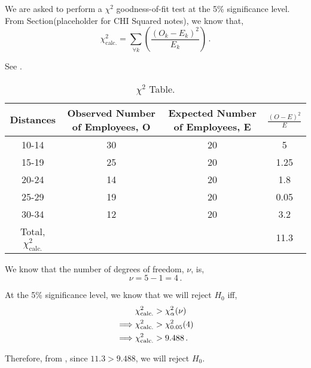 \begin{subquestions}
\begin{subsubquestions}
\subsubquestion
We are asked to perform a $\chi^2$ goodness-of-fit test at the 5\% significance level. From Section(placeholder for CHI Squared notes), we know that,
\begin{equation}
	\chi^2_{\text{calc.}} = \sum_{\forall k} \left( \frac{(O_k-E_k)^2}{E_k}\right) \,.
\end{equation}

 See .
\begin{table}[H]
	\centering
	\begin{tabular}{|c|c|c|c|}
		\hline
		Distances & Observed Number of Employees, O & Expected Number of Employees, E & $\frac{(O-E)^2}{E}$\\
		\hline 
		10-14 & 30 & 20 & 5 \\
		15-19 & 25 & 20 & 1.25 \\
		20-24 & 14 & 20 & 1.8 \\
		25-29 & 19 & 20 & 0.05 \\
		30-34 & 12 & 20 & 3.2 \\
		\hline
		Total, $\chi^2_{\text{calc.}}$ & & & 11.3 \\
		\hline
	\end{tabular}
	\caption{\label{2010:q4:ChiTab} $\chi^2$ Table.}
\end{table}	

 We know that the number of degrees of freedom, $\nu$, is,
\begin{equation}
	\nu = 5-1 = 4\,.
\end{equation}

At the 5\% significance level, we know that we will reject $H_0$ iff,
\begin{align}
	&\chi^2_{\text{calc.}} > \chi^2_{\alpha}(\nu) \nonumber \\
	\implies & \chi^2_{\text{calc.}} > \chi^2_{0.05}(4) \nonumber \\
	\implies & \chi^2_{\text{calc.}} > 9.488 \,.
\end{align} 

Therefore, from , since $11.3>9.488$, we will reject $H_0$.
\end{subsubquestions}

\end{subquestions}
